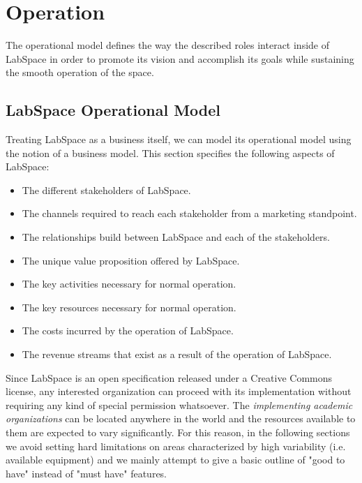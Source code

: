 \documentclass[a4paper, 11pt]{article}
\begin{document}


\section{Operation}

The operational model defines the way the described roles interact inside of LabSpace in order to promote its vision and accomplish its goals while sustaining the smooth operation of the space.

\subsection{LabSpace Operational Model}

Treating LabSpace as a business itself, we can model its operational model using the notion of a business model. This section specifies the following aspects of LabSpace:

\begin{itemize}[noitemsep]
    \item The different stakeholders of LabSpace.
    \item The channels required to reach each stakeholder from a marketing standpoint.
    \item The relationships build between LabSpace and each of the stakeholders.
    \item The unique value proposition offered by LabSpace.
    \item The key activities necessary for normal operation.
    \item The key resources necessary for normal operation.
    \item The costs incurred by the operation of LabSpace.
    \item The revenue streams that exist as a result of the operation of LabSpace.
\end{itemize}

Since LabSpace is an open specification released under a Creative Commons license, any interested organization can proceed with its implementation without requiring any kind of special permission whatsoever. The \textit{implementing academic organizations} can be located anywhere in the world and the resources available to them are expected to vary significantly. For this reason, in the following sections we avoid setting hard limitations on areas characterized by high variability (i.e. available equipment) and we mainly attempt to give a basic outline of "good to have" instead of "must have" features.
\end{document}
